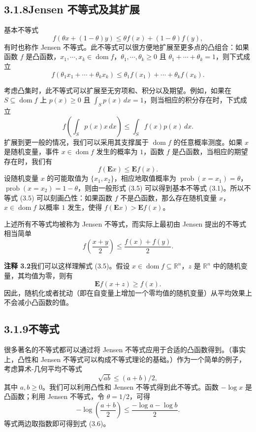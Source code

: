\documentclass[UTF8,12pt,a4paper,fontset=fandol]{ctexart}
\DeclareMathOperator{\dom}{dom}
\begin{document}
\subsection*{3.1.8\quad Jensen 不等式及其扩展}

基本不等式
\[
f(\theta x+(1-\theta)y)\leq \theta f(x)+(1-\theta)f(y),
\]
有时也称作 Jensen 不等式。此不等式可以很方便地扩展至更多点的凸组合：如果函数 $f$ 是凸函数，$x_1,\cdots,x_k\in\dom f$，$\theta_1,\cdots,\theta_k\geq0$ 且 $\theta_1+\cdots+\theta_k=1$，则下式成立
\[
f(\theta_1x_1+\cdots+\theta_kx_k)\leq \theta_1 f(x_1)+\cdots+\theta_k f(x_k).
\]

考虑凸集时，此不等式可以扩展至无穷项和、积分以及期望。例如，如果在 $S\subseteq\dom f$ 上 $p(x)\geq0$ 且 $\int_S p(x)\,dx=1$，则当相应的积分存在时，下式成立
\[
f\left(\int_S p(x)x\,dx\right)\leq \int_S f(x)p(x)\,dx.
\]
扩展到更一般的情况，我们可以采用其支撑属于 $\dom f$ 的任意概率测度。如果 $x$ 是随机变量，事件 $x\in\dom f$ 发生的概率为 $1$，函数 $f$ 是凸函数，当相应的期望存在时，我们有
\begin{equation}
f(\mathbf{E}x)\leq \mathbf{E}f(x).
\tag{3.5}
\end{equation}
设随机变量 $x$ 的可能取值为 $\{x_1,x_2\}$，相应地取值概率为 $\operatorname{prob}(x=x_1)=\theta$，$\operatorname{prob}(x=x_2)=1-\theta$，则由一般形式 (3.5) 可以得到基本不等式 (3.1)。所以不等式 (3.5) 可以刻画凸性：如果函数 $f$ 不是凸函数，那么存在随机变量 $x$，$x\in\dom f$ 以概率 $1$ 发生，使得 $f(\mathbf{E}x)>\mathbf{E}f(x)$。

上述所有不等式均被称为 Jensen 不等式，而实际上最初由 Jensen 提出的不等式相当简单
\[
f\left(\frac{x+y}{2}\right)\leq \frac{f(x)+f(y)}{2}.
\]

\noindent\textbf{注释 3.2}\quad 我们可以这样理解式 (3.5)。假设 $x\in\dom f\subseteq\mathbb{R}^n$，$z$ 是 $\mathbb{R}^n$ 中的随机变量，其均值为零，则有
\[
\mathbf{E}f(x+z)\geq f(x).
\]
因此，随机化或者扰动（即在自变量上增加一个零均值的随机变量）从平均效果上不会减小凸函数的值。

\subsection*{3.1.9\quad 不等式}

很多著名的不等式都可以通过将 Jensen 不等式应用于合适的凸函数得到。（事实上，凸性和 Jensen 不等式可以构成不等式理论的基础。）作为一个简单的例子，考虑算术-几何平均不等式
\begin{equation}
\sqrt{ab}\leq (a+b)/2,
\tag{3.6}
\end{equation}
其中 $a,b\geq0$。我们可以利用凸性和 Jensen 不等式得到此不等式。函数 $-\log x$ 是凸函数；利用 Jensen 不等式，令 $\theta=1/2$，可得
\[
-\log\left(\frac{a+b}{2}\right)\leq \frac{-\log a-\log b}{2}.
\]
等式两边取指数即可得到式 (3.6)。
\end{document}
